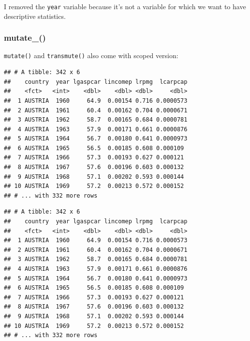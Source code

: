 \documentclass[]{gitbook}
\newenvironment{Shaded}{\begin{snugshade}}{\end{snugshade}}
\newcommand{\KeywordTok}[1]{\textcolor[rgb]{0.13,0.29,0.53}{\textbf{#1}}}
\newcommand{\NormalTok}[1]{#1}
\newcommand{\OperatorTok}[1]{\textcolor[rgb]{0.81,0.36,0.00}{\textbf{#1}}}
\newcommand{\StringTok}[1]{\textcolor[rgb]{0.31,0.60,0.02}{#1}}
\theoremstyle{definition}
\theoremstyle{definition}
\theoremstyle{definition}
\theoremstyle{remark}
\begin{document}
I removed the \texttt{year} variable because it's not a variable for
which we want to have descriptive statistics.

\hypertarget{mutate_}{%
\subsubsection{mutate\_()}\label{mutate_}}

\texttt{mutate()} and \texttt{transmute()} also come with scoped
version:

\begin{Shaded}
\end{Shaded}

\begin{verbatim}
## # A tibble: 342 x 6
##    country  year lgaspcar lincomep lrpmg  lcarpcap
##    <fct>   <int>    <dbl>    <dbl> <dbl>     <dbl>
##  1 AUSTRIA  1960     64.9  0.00154 0.716 0.0000573
##  2 AUSTRIA  1961     60.4  0.00162 0.704 0.0000671
##  3 AUSTRIA  1962     58.7  0.00165 0.684 0.0000781
##  4 AUSTRIA  1963     57.9  0.00171 0.661 0.0000876
##  5 AUSTRIA  1964     56.7  0.00180 0.641 0.0000973
##  6 AUSTRIA  1965     56.5  0.00185 0.608 0.000109 
##  7 AUSTRIA  1966     57.3  0.00193 0.627 0.000121 
##  8 AUSTRIA  1967     57.6  0.00196 0.603 0.000132 
##  9 AUSTRIA  1968     57.1  0.00202 0.593 0.000144 
## 10 AUSTRIA  1969     57.2  0.00213 0.572 0.000152 
## # ... with 332 more rows
\end{verbatim}

\begin{Shaded}
\end{Shaded}

\begin{verbatim}
## # A tibble: 342 x 6
##    country  year lgaspcar lincomep lrpmg  lcarpcap
##    <fct>   <int>    <dbl>    <dbl> <dbl>     <dbl>
##  1 AUSTRIA  1960     64.9  0.00154 0.716 0.0000573
##  2 AUSTRIA  1961     60.4  0.00162 0.704 0.0000671
##  3 AUSTRIA  1962     58.7  0.00165 0.684 0.0000781
##  4 AUSTRIA  1963     57.9  0.00171 0.661 0.0000876
##  5 AUSTRIA  1964     56.7  0.00180 0.641 0.0000973
##  6 AUSTRIA  1965     56.5  0.00185 0.608 0.000109 
##  7 AUSTRIA  1966     57.3  0.00193 0.627 0.000121 
##  8 AUSTRIA  1967     57.6  0.00196 0.603 0.000132 
##  9 AUSTRIA  1968     57.1  0.00202 0.593 0.000144 
## 10 AUSTRIA  1969     57.2  0.00213 0.572 0.000152 
## # ... with 332 more rows
\end{verbatim}
\end{document}
